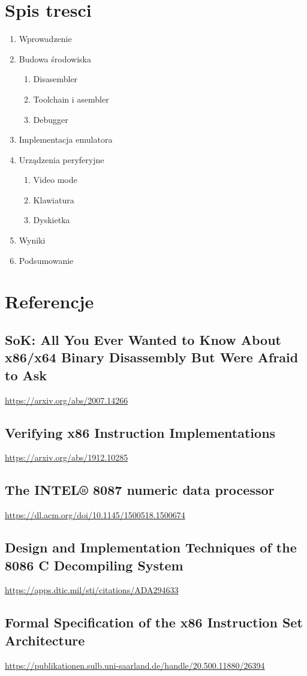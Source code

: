 \documentclass[11pt]{article}
\begin{document}
\section{Spis tresci}
\label{sec:org16d53d7}
\begin{enumerate}
\item Wprowadzenie
\item Budowa środowiska
\begin{enumerate}
\item Disasembler
\item Toolchain i asembler
\item Debugger
\end{enumerate}
\item Implementacja emulatora
\item Urządzenia peryferyjne
\begin{enumerate}
\item Video mode
\item Klawiatura
\item Dyskietka
\end{enumerate}
\item Wyniki
\item Podsumowanie
\end{enumerate}
\section{Referencje}
\label{sec:org6719200}
\subsection{SoK: All You Ever Wanted to Know About x86/x64 Binary Disassembly But Were Afraid to Ask}
\label{sec:org879cf05}
\url{https://arxiv.org/abs/2007.14266}
\subsection{Verifying x86 Instruction Implementations}
\label{sec:org976882f}
\url{https://arxiv.org/abs/1912.10285}
\subsection{The INTEL® 8087 numeric data processor}
\label{sec:org00517cf}
\url{https://dl.acm.org/doi/10.1145/1500518.1500674}
\subsection{Design and Implementation Techniques of the 8086 C Decompiling System}
\label{sec:orgafaa8b4}
\url{https://apps.dtic.mil/sti/citations/ADA294633}
\subsection{Formal Specification of the x86 Instruction Set Architecture}
\label{sec:orgf1e4221}
\url{https://publikationen.sulb.uni-saarland.de/handle/20.500.11880/26394}
\end{document}
